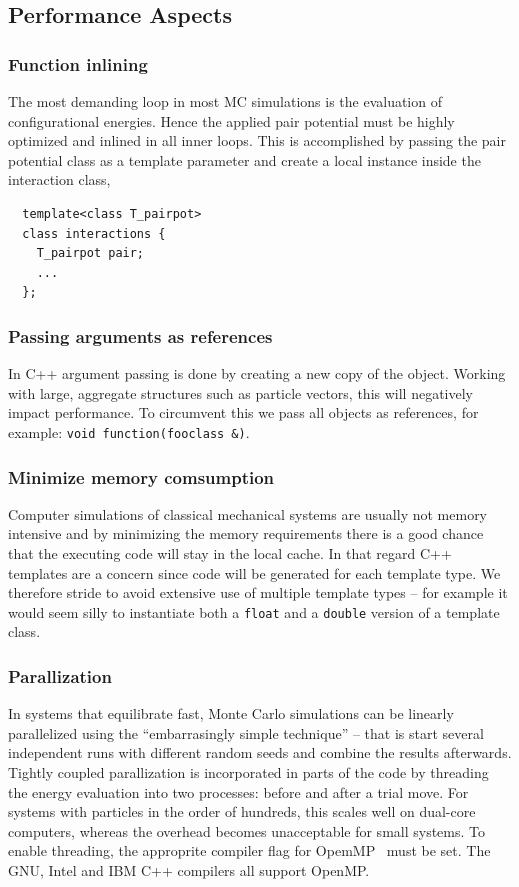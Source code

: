 \documentclass[10pt]{bmc_article}
\newenvironment{bmcformat}{\fussy\setboolean{publ}{true}}{\fussy}
\begin{document}
\begin{bmcformat}
\subsection*{Performance Aspects}
\subsubsection*{Function inlining}
The most demanding loop in most MC simulations is the evaluation of configurational energies. Hence the applied pair potential must be highly optimized and inlined in all inner loops.
This is accomplished by passing the pair potential class as a template parameter and create a local instance inside the interaction class,
\begin{verbatim}
  template<class T_pairpot>
  class interactions {
    T_pairpot pair;
    ...
  };
\end{verbatim}

\subsubsection*{Passing arguments as references}
In C++ argument passing is done by creating a new copy of the object. Working with large, aggregate structures such as particle vectors, this will negatively impact performance. To circumvent this we pass all objects as references, for example: \verb"void function(fooclass &)".

\subsubsection*{Minimize memory comsumption}
Computer simulations of classical mechanical systems are usually not memory intensive and by minimizing the memory requirements there is a good chance that the executing code will stay in the local cache. In that regard C++ templates are a concern since code will be generated for each template type. We therefore stride to avoid extensive use of multiple template types -- for example it would seem silly to instantiate both a \verb"float" and a \verb"double" version of a template class.

\subsubsection*{Parallization}
In systems that equilibrate fast, Monte Carlo simulations can be linearly parallelized using the ``embarrasingly simple technique'' -- that is start several independent runs with different random seeds and combine the results afterwards.
Tightly coupled parallization is incorporated in parts of the code by threading the energy evaluation into two processes: before and after a trial move.
For systems with particles in the order of hundreds, this scales well on dual-core computers, whereas the overhead becomes unacceptable for small systems. To enable threading, the approprite compiler flag for OpemMP~\cite{openmp:98} must be set. The GNU, Intel and IBM C++ compilers all support OpenMP.


\end{bmcformat}
\end{document}
